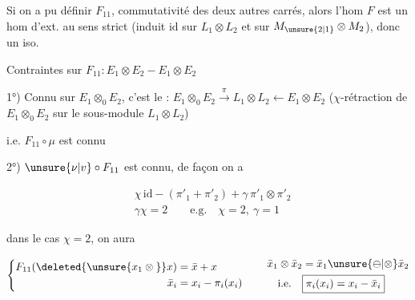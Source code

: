 
Si on a pu définir $F_{11}$,  commutativité des deux autres carrés, alors l'hom $F$ est un hom d'ext. au sens strict (induit $\mathrm{id}$ sur $L_1\otimes L_2$ et sur $M_{\unsure{2|1}}\otimes M_2$), donc  un iso.

Contraintes sur $F_{11}:E_1\otimes E_2 - E_1\otimes E_2$ 

1°) Connu sur $E_1\otimes_0 E_2$, c'est le :
$E_1\otimes_0 E_2\xrightarrow{\pi}L_1\otimes L_2\longleftarrow E_1\otimes E_2$
($\chi$-rétraction de $E_1\otimes_0 E_2$ sur le sous-module $L_1\otimes L_2$)

i.e. $F_{11}\circ\mu$ est connu


2°) $\unsure{\nu|v}\circ F_{11}$ est connu, de façon  on a



\[
\boxed{\begin{aligned}
 &\chi\,\mathrm{id}-(\pi'_1+\pi'_2)+\gamma\,\pi'_1\otimes\pi'_2\\
 &\gamma\chi=2\qquad \text{e.g.}\quad\chi=2,\ \gamma=1
\end{aligned}}
\]

dans le cas $\chi=2$, on aura

\[
\left\{\begin{aligned}
 F_{11}(\deleted{\unsure{x_1\otimes{}}}x)&=\bar x+x\\
 \bar x_i&=x_i-\pi_i(x_i)
\end{aligned}\right.
\qquad
\begin{aligned}
\bar{x}_1\otimes\bar{x}_2&=\bar{x}_1\unsure{\ominus|\otimes}\bar{x}_2\\
\text{i.e.}\quad &\boxed{\pi_i(x_i)=x_i-\bar x_i}
\end{aligned}
\]


